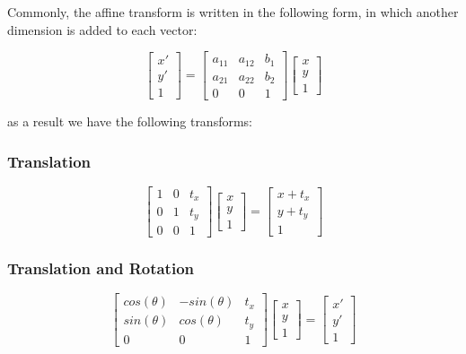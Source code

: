 \noindent Commonly, the affine transform is written in the following form, in which another dimension is added to each vector:

\begin{equation}
    \begin{bmatrix}
    x' \\ y' \\ 1
    \end{bmatrix}
    =
    \begin{bmatrix}
    a_{11} & a_{12} & b_{1} \\
    a_{21} & a_{22} & b_{2} \\
    0 & 0 & 1
    \end{bmatrix}
    \begin{bmatrix}
    x \\ y \\ 1
    \end{bmatrix}
\end{equation}

\noindent as a result we have the following transforms:

\subsubsection{Translation}

\begin{equation}
    \begin{bmatrix}
    1 & 0 & t_{x} \\
    0 & 1 & t_{y} \\
    0 & 0 & 1
    \end{bmatrix}
    \begin{bmatrix}
    x \\ y \\ 1
    \end{bmatrix}
    =
    \begin{bmatrix}
    x+ t_{x} \\
    y+ t_{y} \\
    1
    \end{bmatrix}
\end{equation}

\subsubsection{Translation and Rotation}

\begin{equation}
    \begin{bmatrix}
    cos(\theta) & -sin(\theta) & t_{x} \\
    sin(\theta) & cos(\theta) & t_{y} \\
    0 & 0 & 1
    \end{bmatrix}
    \begin{bmatrix}
    x \\ y \\ 1
    \end{bmatrix}
    =
    \begin{bmatrix}
    x' \\
    y' \\
    1
    \end{bmatrix}
\end{equation}

